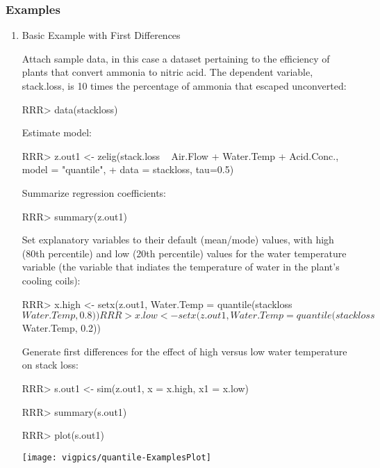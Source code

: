 \subsubsection{Examples}
\begin{enumerate}
\item Basic Example with First Differences

Attach sample data, in this case a dataset pertaining to the efficiency of plants
that convert ammonia to nitric acid. The dependent variable, stack.loss, is 10 times
the percentage of ammonia that escaped unconverted:
\begin{Schunk}
\begin{Sinput}
RRR>  data(stackloss)
\end{Sinput}
\end{Schunk}
Estimate model:
\begin{Schunk}
\begin{Sinput}
RRR>  z.out1 <- zelig(stack.loss ~  Air.Flow + Water.Temp + Acid.Conc., model = "quantile", 
+                 data = stackloss, tau=0.5)
\end{Sinput}
\end{Schunk}
Summarize regression coefficients:
\begin{Schunk}
\begin{Sinput}
RRR>  summary(z.out1)
\end{Sinput}
\end{Schunk}
Set explanatory variables to their default (mean/mode) values, with
high (80th percentile) and low (20th percentile) values for the water temperature
variable (the variable that indiates the temperature of water in the plant's cooling
coils):
\begin{Schunk}
\begin{Sinput}
RRR>  x.high <- setx(z.out1, Water.Temp = quantile(stackloss$Water.Temp, 0.8))
RRR>  x.low <- setx(z.out1, Water.Temp = quantile(stackloss$Water.Temp, 0.2))
\end{Sinput}
\end{Schunk}
Generate first differences for the effect of high versus low water temperature on
stack loss:
\begin{Schunk}
\begin{Sinput}
RRR>  s.out1 <- sim(z.out1, x = x.high, x1 = x.low)
\end{Sinput}
\end{Schunk}
\begin{Schunk}
\begin{Sinput}
RRR> summary(s.out1)
\end{Sinput}
\end{Schunk}
\begin{center}
\begin{Schunk}
\begin{Sinput}
RRR>  plot(s.out1)
\end{Sinput}
\end{Schunk}
\texttt{[image: vigpics/quantile-ExamplesPlot]}
\end{center}


\end{enumerate}
